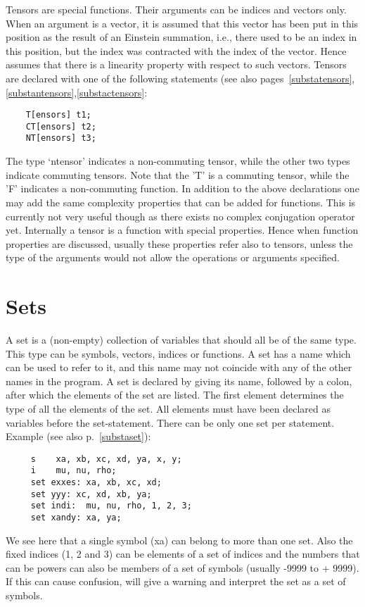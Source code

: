 Tensors are special functions. Their arguments can be 
indices and vectors only. When an argument is a vector, it is assumed that 
this vector has been put in this position as the result of an 
Einstein summation, i.e., there 
used to be an index in this position, but the index was contracted with the 
index of the vector. Hence {\FORM} assumes that there is a linearity 
property with respect to such vectors. Tensors are declared with one of the 
following statements (see also pages~\ref{substatensors},
\ref{substantensors},\ref{substactensors}:
\begin{verbatim}
    T[ensors] t1;
    CT[ensors] t2;
    NT[ensors] t3;
\end{verbatim}
The type `ntensor' indicates a non-commuting tensor, while the other two 
types indicate commuting tensors. Note that the 'T' is a 
commuting tensor, while the 'F' indicates a non-commuting function. In 
addition to the above declarations one may add the same complexity 
properties that can be added for functions. This is currently not very 
useful though as there exists no complex conjugation 
operator yet. Internally a tensor is a function with special properties. 
Hence when function properties are discussed, usually these properties 
refer also to tensors, unless the type of the arguments would not allow 
the operations or arguments specified.

\section{Sets}

\label{sect-sets}
A set is a (non-empty) collection of variables that should 
all be of the same type. This type can be symbols, vectors, indices or 
functions. A set has a name which can be used to refer to 
it, and this name may not coincide with any of the other names in the 
program. A set is declared by giving its name, followed by a 
colon, after which the elements of the set are listed. The first 
element determines the type of all the elements of the set. All 
elements must have been declared as variables before the set-statement. 
There can be only one set per statement. Example (see also 
p.~\ref{substaset}): 
\begin{verbatim}
     s    xa, xb, xc, xd, ya, x, y;
     i    mu, nu, rho;
     set exxes: xa, xb, xc, xd;
     set yyy: xc, xd, xb, ya;
     set indi:  mu, nu, rho, 1, 2, 3;
     set xandy: xa, ya;
\end{verbatim}
We see here that a single symbol (xa) can belong to more than one set. 
Also the fixed indices (1, 2 and 3) can be elements 
of a set of indices and the numbers that can be powers can also be 
members of a set of symbols (usually -9999 to + 9999). If this can cause 
confusion, {\FORM} will give a warning and interpret the set as a 
set of symbols.

